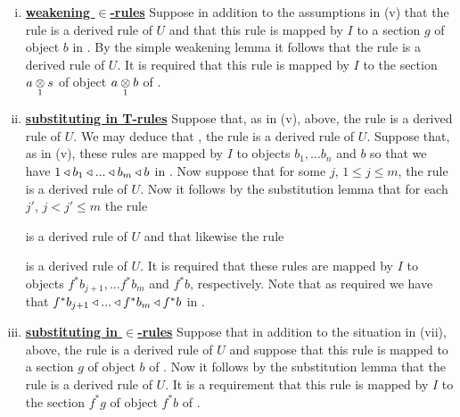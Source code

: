 \begin{definition}
\begin{enumerate}[(i)]
\item \underline{\textbf{weakening $\boldsymbol {\in}$-rules}} 
Suppose in addition to the assumptions in (v) that the rule  is a derived rule of $U$ 
and that this rule is mapped by $I$ to a section $g$ of object $b$ in \catc.
By the simple weakening lemma it follows that the rule 
is a derived rule of $U$. It is required that this rule is mapped by $I$ to the section $\crossx{a}{s}{1}$
of object $\crossx{a}{b}{1}$ of \catc.


\item \underline{\textbf{substituting in T-rules}} 
Suppose that, as in (v), above, the rule 
 is a derived rule of $U$.
We may deduce that \foreachj, the rule    is a derived rule of $U$. 
Suppose that, as in (v), these rules are mapped by $I$ to objects $b_1,...b_n$ and $b$ so that
we have  $1 \base b_1 \base ... \base b_m \base b$ in \catc. Now suppose that for some $j$, $1 \leq j \leq m$, the rule
 is a derived rule of $U$. 
Now it follows by the substitution lemma that for each $j'$, $j < j' \leq m$ the rule

 is a derived rule of $U$ and that likewise the rule

 is a derived rule of $U$.
It is required that these rules are mapped by $I$ to objects $f^*b_{j+1},...f^*b_m$ and $f^*b$, respectively.
Note that as required we have that $f^*b_{j+1}\base ... \base f^*b_m \base f^*b$ in \catc.

\item \underline{\textbf{substituting in $\boldsymbol {\in}$-rules}} 
Suppose that in addition to the situation in (vii), above, the rule
is a derived rule of $U$ and suppose that this rule is mapped to a section $g$ of object $b$ of \catc.
Now it follows by the substitution lemma that the rule
is a derived rule of $U$.
It is a requirement that this rule is mapped by $I$ to the section $f^*g$ of object $f^*b$ of \catc.
\end{enumerate}
\end{definition}


